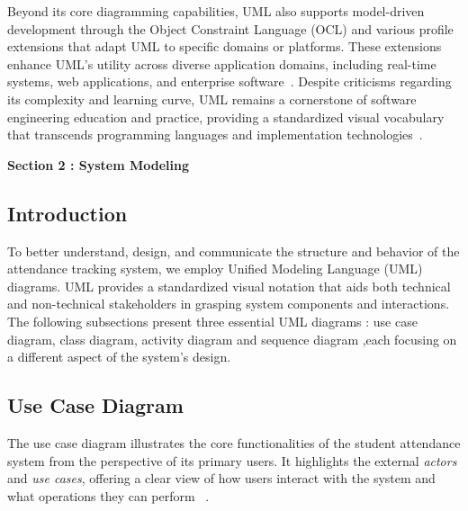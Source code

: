 \documentclass[12pt,a4paper]{report}
\begin{document}
Beyond its core diagramming capabilities, UML also supports model-driven development through the Object Constraint Language (OCL) and various profile extensions that adapt UML to specific domains or platforms. These extensions enhance UML's utility across diverse application domains, including real-time systems, web applications, and enterprise software~\cite{omg2017}.
Despite criticisms regarding its complexity and learning curve, UML remains a cornerstone of software engineering education and practice, providing a standardized visual vocabulary that transcends programming languages and implementation technologies~\cite{sommerville2015}.

\vspace{3cm}


\newpage
\vspace{0.3cm}

\begin{tcolorbox}[
    colback=mintgreen!20, 
    colframe=mintgreen!80!black, 
    width=\textwidth, 
    boxrule=1pt, 
    arc=5pt, 
    auto outer arc,
    left=10pt,
    right=10pt,
    top=6pt,
    bottom=6pt
]
    \centering
    \Large \textbf{Section 2 : System Modeling} %
\end{tcolorbox}

{}

\subsection{Introduction}
To better understand, design, and communicate the structure and behavior of the attendance tracking system, we employ Unified Modeling Language (UML) diagrams. UML provides a standardized visual notation that aids both technical and non-technical stakeholders in grasping system components and interactions. The following subsections present three essential UML diagrams : use case diagram, class diagram, activity diagram and sequence diagram ,each focusing on a different aspect of the system's design.

\subsection{Use Case Diagram}
The use case diagram illustrates the core functionalities of the student attendance system from the perspective of its primary users. It highlights the external \textit{actors} and \textit{use cases}, offering a clear view of how users interact with the system and what operations they can perform ~\cite{fowler2004}.
\end{document}
